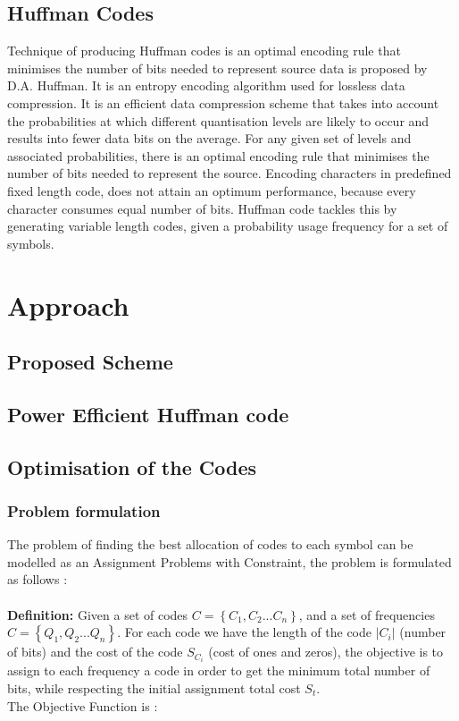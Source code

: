 \documentclass[preprint,12pt]{elsarticle}
\begin{document}
\subsection{Huffman Codes}
Technique of producing Huffman codes is an optimal encoding rule that minimises the number of bits needed to represent source data is proposed by D.A. Huffman\cite{Huff51}. It is an entropy encoding algorithm used for lossless data compression. It is an efficient data compression scheme that takes into account the probabilities at which different quantisation levels are likely to occur and results into fewer data bits on the average. For any given set of levels and associated probabilities, there is an optimal encoding rule that minimises the number of bits needed to represent the source. Encoding characters in predefined fixed length code, does not attain an optimum performance, because every character consumes equal number of bits. Huffman code tackles this by generating variable length codes, given a probability usage frequency for a set of symbols.
\section{Approach}
\subsection{Proposed Scheme}
\subsection{Power Efficient Huffman code}
\subsection{Optimisation of the Codes}
\subsubsection{Problem formulation}
The problem of finding the best allocation of codes to each symbol can be   modelled as an Assignment Problems with Constraint, the problem is formulated as follows :\\\\
\textbf{Definition:} Given a set of codes $C=\left\{C_{1},C_{2}...C_{n}\right\}$, and a set of frequencies $C=\left\{Q_{1},Q_{2}...Q_{n}\right\}$. For each code we have the length of the code $|C_{i}|$ (number of bits) and the cost of the code $S_{C_{i}}$ (cost of ones and zeros), the objective is to assign to each frequency a code in order to get the minimum total number of bits, while respecting the initial assignment total cost $S_{t}$.   
\\
The Objective Function is : 
\end{document}
